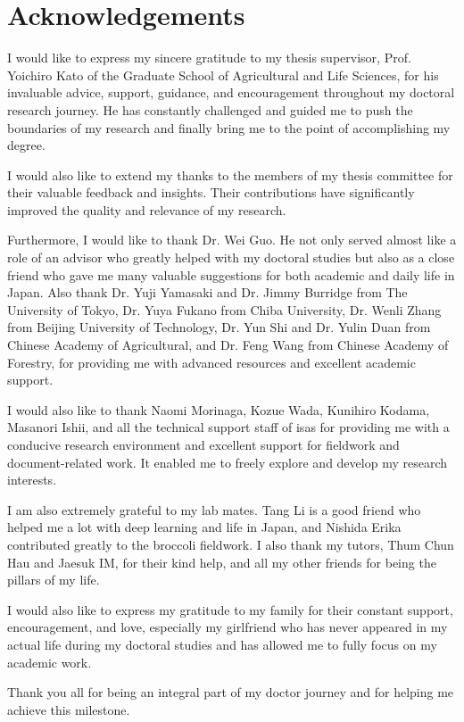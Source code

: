 \chapter*{Acknowledgements}

I would like to express my sincere gratitude to my thesis supervisor, Prof. Yoichiro Kato of the Graduate School of Agricultural and Life Sciences, for his invaluable advice, support, guidance, and encouragement throughout my doctoral research journey. He has constantly challenged and guided me to push the boundaries of my research and finally bring me to the point of accomplishing my degree.

I would also like to extend my thanks to the members of my thesis committee for their valuable feedback and insights. Their contributions have significantly improved the quality and relevance of my research.

Furthermore, I would like to thank Dr. Wei Guo. He not only served almost like a role of an advisor who greatly helped with my doctoral studies but also as a close friend who gave me many valuable suggestions for both academic and daily life in Japan. Also thank Dr. Yuji Yamasaki and Dr. Jimmy Burridge from The University of Tokyo, Dr. Yuya Fukano from Chiba University, Dr. Wenli Zhang from Beijing University of Technology, Dr. Yun Shi and Dr. Yulin Duan from Chinese Academy of Agricultural, and Dr. Feng Wang from Chinese Academy of Forestry, for providing me with advanced resources and excellent academic support.

I would also like to thank Naomi Morinaga, Kozue Wada, Kunihiro Kodama, Masanori Ishii, and all the technical support staff of \gls{isas} for providing me with a conducive research environment and excellent support for fieldwork and document-related work. It enabled me to freely explore and develop my research interests.

I am also extremely grateful to my lab mates. Tang Li is a good friend who helped me a lot with deep learning and life in Japan, and Nishida Erika contributed greatly to the broccoli fieldwork. I also thank my tutors, Thum Chun Hau and Jaesuk IM, for their kind help, and all my other friends for being the pillars of my life.

I would also like to express my gratitude to my family for their constant support, encouragement, and love, especially my girlfriend who has never appeared in my actual life during my doctoral studies and has allowed me to fully focus on my academic work.

Thank you all for being an integral part of my doctor journey and for helping me achieve this milestone.